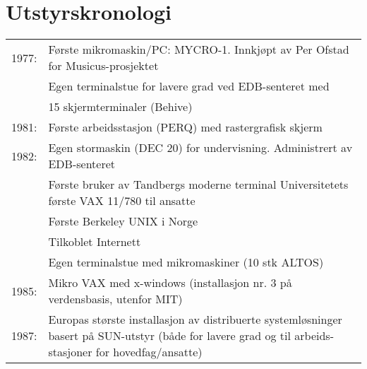 \chapter*{Utstyrskronologi}

\begin{tabularx}{\textwidth}{ll}
	1977: & Første mikromaskin/PC: MYCRO-1. Innkjøpt av Per Ofstad for Musicus-prosjektet \\
	& Egen terminalstue for lavere grad ved EDB-senteret med \\
	& 15 skjermterminaler (Behive) \\
	1981: & Første arbeidsstasjon (PERQ) med rastergrafisk skjerm \\
	1982: & Egen stormaskin (DEC 20) for undervisning. Administrert av EDB-senteret \\
	& Første bruker av Tandbergs moderne terminal Universitetets første VAX 11/780 til ansatte \\
	& Første Berkeley UNIX i Norge \\
	& Tilkoblet Internett \\
	& Egen terminalstue med mikromaskiner (10 stk ALTOS) \\
	1985: & Mikro VAX med x-windows (installasjon nr. 3 på verdensbasis, utenfor MIT) \\
	1987: & Europas største installasjon av distribuerte systemløsninger basert på SUN-utstyr (både for lavere grad og til arbeids- stasjoner for hovedfag/ansatte) \\
\end{tabularx}